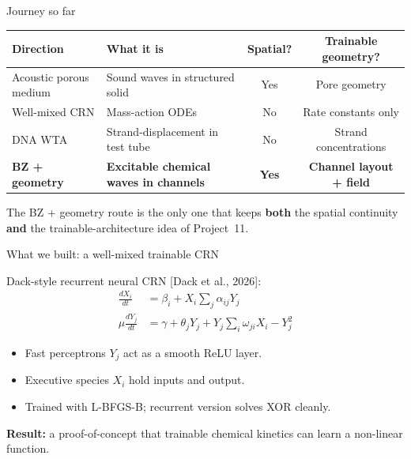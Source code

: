 \documentclass[aspectratio=169,11pt]{beamer}
\newcommand{\citeslide}[1]{\hfill{\footnotesize [#1]}}
\begin{document}
\begin{frame}{Journey so far}

\begin{table}
\centering
\small
\begin{tabular}{p{3.0cm}p{5.0cm}cc}
\toprule
\textbf{Direction} & \textbf{What it is} & \textbf{Spatial?} & \textbf{Trainable geometry?} \\
\midrule
Acoustic porous medium & Sound waves in structured solid & Yes & Pore geometry \\
Well-mixed CRN & Mass-action ODEs & No & Rate constants only \\
DNA WTA & Strand-displacement in test tube & No & Strand concentrations \\
\textbf{BZ + geometry} & \textbf{Excitable chemical waves in channels} & \textbf{Yes} & \textbf{Channel layout + field} \\
\bottomrule
\end{tabular}
\end{table}

\vspace{0.3cm}
\centering
The BZ + geometry route is the only one that keeps \textbf{both} the spatial continuity \textbf{and} the trainable-architecture idea of Project~11.

\end{frame}

\begin{frame}{What we built: a well-mixed trainable CRN}

Dack-style recurrent neural CRN \citeslide{Dack et al., 2026}:
\begin{align*}
    \frac{dX_i}{dt} &= \beta_i + X_i \sum_j \alpha_{ij} Y_j \\
    \mu \frac{dY_j}{dt} &= \gamma + \theta_j Y_j + Y_j \sum_i \omega_{ji} X_i - Y_j^2
\end{align*}

\vspace{0.2cm}
\begin{itemize}
    \item Fast perceptrons $Y_j$ act as a smooth ReLU layer.
    \item Executive species $X_i$ hold inputs and output.
    \item Trained with L-BFGS-B; recurrent version solves XOR cleanly.
\end{itemize}

\vspace{0.2cm}
\centering
\textbf{Result:} a proof-of-concept that trainable chemical kinetics can learn a non-linear function.

\end{frame}
\end{document}
